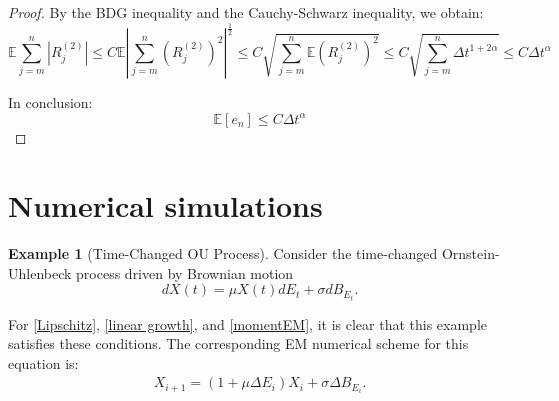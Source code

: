 \documentclass[10pt,reqno,final]{amsart}
\theoremstyle{plain}
\theoremstyle{definition}
\newtheorem{example}{Example}
\theoremstyle{remark}
\numberwithin{equation}{section}
\numberwithin{figure}{section}
\numberwithin{table}{section}
\begin{document}
\begin{proof}
	By the BDG inequality and the Cauchy-Schwarz inequality, we obtain:
	\begin{equation*}
		\mathbb{E} \sum_{j=m}^{n} \left| R_{j}^{(2)} \right|  \le C \mathbb{E} \left| \sum_{j=m}^{n} (R_{j}^{(2)})^2 \right|^{\frac{1}{2}} \le C \sqrt{ \sum_{j=m}^{n} \mathbb{E} (R_{j}^{(2)})^2 } \le C \sqrt{ \sum_{j=m}^{n} \Delta t^{1 + 2\alpha} } \le C \Delta t^{\alpha}
	\end{equation*}
	
	In conclusion:
	\begin{equation*}
		\mathbb{E} [e_n] \leq C \Delta t^\alpha
	\end{equation*}
	
\end{proof}











\section{Numerical simulations}


\begin{example}[Time-Changed OU Process]
	Consider the time-changed Ornstein-Uhlenbeck process driven by Brownian motion
	\begin{equation}\label{linear}
		dX(t) = \mu X(t) dE_t + \sigma dB_{E_t}.
	\end{equation}
\end{example}
For \cref{Lipschitz}, \cref{linear growth}, and \cref{momentEM}, it is clear that this example satisfies these conditions. The corresponding EM numerical scheme for this equation is:
\begin{align*}
	X_{i+1} = (1 + \mu \Delta E_i) X_i + \sigma \Delta B_{E_i}.
\end{align*}
\end{document}
